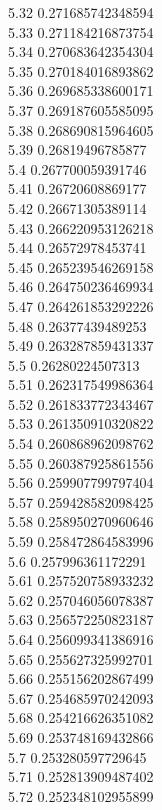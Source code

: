 {5.32	0.271685742348594\\
5.33	0.271184216873754\\
5.34	0.270683642354304\\
5.35	0.270184016893862\\
5.36	0.269685338600171\\
5.37	0.269187605585095\\
5.38	0.268690815964605\\
5.39	0.26819496785877\\
5.4	0.267700059391746\\
5.41	0.26720608869177\\
5.42	0.26671305389114\\
5.43	0.266220953126218\\
5.44	0.26572978453741\\
5.45	0.265239546269158\\
5.46	0.264750236469934\\
5.47	0.264261853292226\\
5.48	0.26377439489253\\
5.49	0.263287859431337\\
5.5	0.26280224507313\\
5.51	0.262317549986364\\
5.52	0.261833772343467\\
5.53	0.261350910320822\\
5.54	0.260868962098762\\
5.55	0.260387925861556\\
5.56	0.259907799797404\\
5.57	0.259428582098425\\
5.58	0.258950270960646\\
5.59	0.258472864583996\\
5.6	0.257996361172291\\
5.61	0.257520758933232\\
5.62	0.257046056078387\\
5.63	0.256572250823187\\
5.64	0.256099341386916\\
5.65	0.255627325992701\\
5.66	0.255156202867499\\
5.67	0.254685970242093\\
5.68	0.254216626351082\\
5.69	0.253748169432866\\
5.7	0.253280597729645\\
5.71	0.252813909487402\\
5.72	0.252348102955899\\
}
